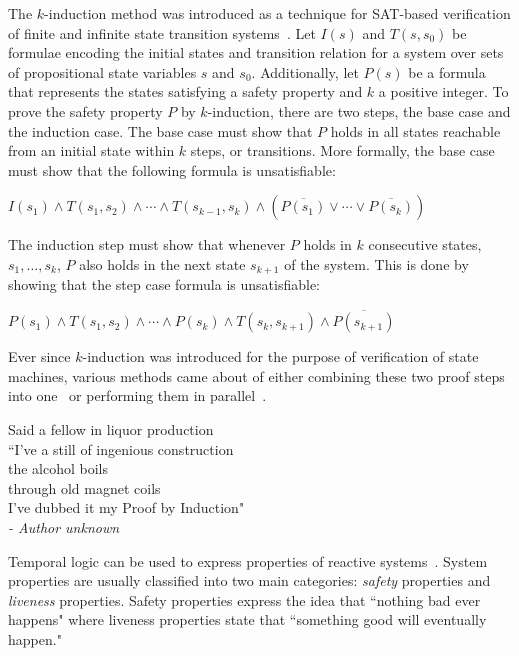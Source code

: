 \label{subsubsec:kInd}
The $k$-induction method was introduced as a technique for SAT-based verification of finite and infinite state transition systems~\cite{sheeran2000checking}. Let $I(s)$ and $T(s, s_0)$ be formulae encoding the initial states and transition relation for a system over sets of propositional state variables $s$ and $s_0$. Additionally, let $P(s)$ be a formula that represents the states satisfying a safety property and $k$ a positive integer. To prove the safety property $P$ by $k$-induction, there are two steps, the base case and the induction case. The base case must show that $P$ holds in all states reachable from an initial state within $k$ steps, or transitions. More formally, the base case must show that the following formula is unsatisfiable:

\begin{center}
$I(s_1) \land T(s_1, s_2) \land \cdots \land T(s_{k−1}, s_k) \land (\overline{P(s_1)} \lor \cdots \lor \overline{P(s_k)})$
\end{center}

The induction step must show that whenever $P$ holds in $k$ consecutive states, $s_1, \ldots, s_k$, $P$ also holds in the next state $s_{k+1}$ of the system. This is done by showing that the step case formula is unsatisfiable:

\begin{center}
$P(s_1) \land T(s_1, s_2) \land \cdots \land P(s_k) \land T(s_{k}, s_{k+1}) \land \overline{P(s_{k+1})}$
\end{center}

Ever since $k$-induction was introduced for the purpose of verification of state machines, various methods came about of either combining these two proof steps into one~\cite{donaldson2011software} or performing them in parallel~\cite{kahsai2011pkind}. \\

\begin{center}
Said a fellow in liquor production\\
``I’ve a still of ingenious construction\\
the alcohol boils\\
through old magnet coils\\
I’ve dubbed it my Proof by Induction"\\
\textit{- Author unknown}
\end{center}

Temporal logic can be used to express properties of reactive systems~\cite{Bozzano:2010:DSA:1951720}. System properties are usually classified into two main categories: {\em safety} properties and {\em liveness} properties. Safety properties express the idea that ``nothing bad ever happens" where liveness properties state that ``something good will eventually happen." 

